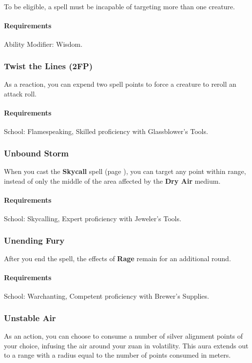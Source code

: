     To be eligible, a spell must be incapable of targeting more than one creature.
    \paragraph{Requirements} Ability Modifier: Wisdom.
\subsubsection{Twist the Lines (2FP)} \label{feat::twistthelines}
    As a reaction, you can expend two spell points to force a creature to reroll an attack roll.
    \paragraph{Requirements} School: Flamespeaking, Skilled proficiency with Glassblower's Tools.
\subsubsection{Unbound Storm} \label{feat::unboundstorm}
    When you cast the \textbf{Skycall} spell (page \pageref{spell::skycall}), you can target any point within range, instead of only the middle of the area affected by the \textbf{Dry Air} medium.
    \paragraph{Requirements} School: Skycalling, Expert proficiency with Jeweler's Tools.
\subsubsection{Unending Fury} \label{feat::unendingfury}
    After you end the spell, the effects of \textbf{Rage} remain for an additional round.
    \paragraph{Requirements} School: Warchanting, Competent proficiency with Brewer's Supplies.
\subsubsection{Unstable Air} \label{feat::unstableair}
    As an action, you can choose to consume a number of silver alignment points of your choice, infusing the air around your zuan in volatility.
    This aura extends out to a range with a radius equal to the number of points consumed in meters.

